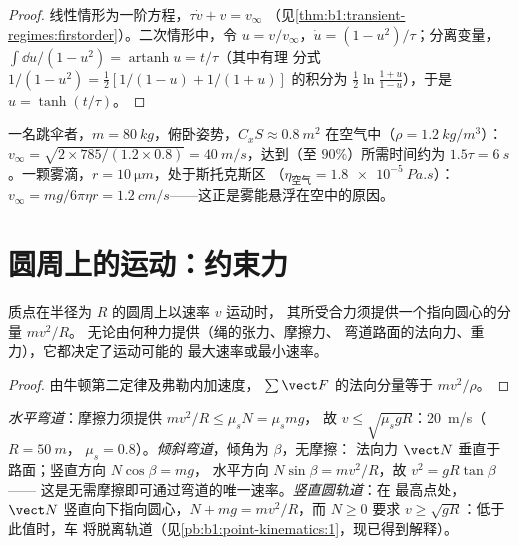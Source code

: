 \begin{proof}
线性情形为一阶方程，$\tau\dot v + v = v_\infty$
（见\cref{thm:b1:transient-regimes:firstorder}）。二次情形中，令
$u = v/v_\infty$，$\dot u = (1 - u^2)/\tau$；分离变量，
$\int\dd u/(1 - u^2) = \operatorname{artanh}u = t/\tau$（其中有理
分式 $1/(1 - u^2) = \tfrac12[1/(1 - u) + 1/(1 + u)]$ 的积分为
$\tfrac12\ln\frac{1 + u}{1 - u}$），于是 $u = \tanh(t/\tau)$。
\end{proof}

\begin{example}[两种终端速度]\label{ex:b1:newton-dynamics:terminal}
一名跳伞者，$m = \qty{80}{kg}$，俯卧姿势，$C_xS \approx \qty{0.8}{m^2}$
在空气中（$\rho = \qty{1.2}{kg/m^3}$）：$v_\infty = \sqrt{2 \times 785/(1.2
\times 0.8)} = \qty{40}{m/s}$，达到（至 $90\%$）所需时间约为 $1.5\tau =
\qty{6}{s}$。一颗雾滴，$r = \qty{10}{\micro m}$，处于斯托克斯区
（$\eta_{\text{空气}} = \qty{1.8e-5}{Pa.s}$）：$v_\infty = mg/6\pi\eta r =
\qty{1.2}{cm/s}$——这正是雾能悬浮在空中的原因。
\end{example}

\section{圆周上的运动：约束力}

\begin{proposition}[向心条件]\label{prop:b1:newton-dynamics:centripetal}
质点在半径为 $R$ 的圆周上以速率 $v$ 运动时，
其所受合力须提供一个指向圆心的分量 $mv^2/R$。
无论由何种力提供（绳的张力、摩擦力、
弯道路面的法向力、重力），它都决定了运动可能的
最大速率或最小速率。
\end{proposition}

\begin{proof}
由牛顿第二定律及弗勒内加速度，
$\sum\vect F$ 的法向分量等于 $mv^2/\rho$。
\end{proof}

\begin{example}[三种圆周]\label{ex:b1:newton-dynamics:circles}
\emph{水平弯道}：摩擦力须提供 $mv^2/R \leq \mu_sN = \mu_smg$，
故 $v \leq \sqrt{\mu_sgR}$：\qty{20}{m/s}（$R = \qty{50}{m}$，
$\mu_s = 0.8$）。\emph{倾斜弯道}，倾角为 $\beta$，无摩擦：
法向力 $\vect N$ 垂直于路面；竖直方向 $N\cos\beta = mg$，
水平方向 $N\sin\beta = mv^2/R$，故 $v^2 = gR\tan\beta$——
这是无需摩擦即可通过弯道的唯一速率。\emph{竖直圆轨道}：在
最高点处，$\vect N$ 竖直向下指向圆心，$N + mg =
mv^2/R$，而 $N \geq 0$ 要求 $v \geq \sqrt{gR}$：低于此值时，车
将脱离轨道（见\cref{pb:b1:point-kinematics:1}，现已得到解释）。
\end{example}

